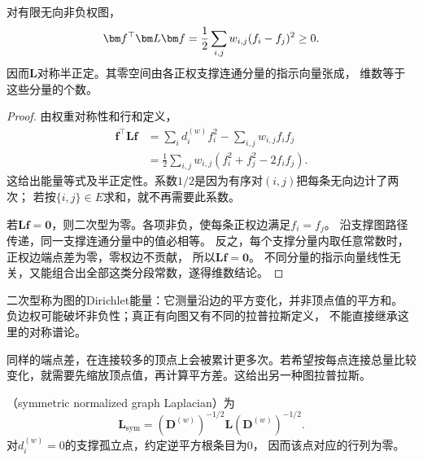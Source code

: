 \begin{theorem}[图拉普拉斯的Dirichlet能量与零空间]
  \label{thm:graph-theory-laplacian-energy-nullspace}
  对有限无向非负权图，
  \begingroup
  \let\graphenergylabel\label
  \begin{equation}
    \let\label\graphenergylabel
    \bm f^\top\bm L\bm f
    =\frac12\sum_{i,j}w_{i,j}(f_i-f_j)^2\geq0.
    \label{eq:graph-theory-dirichlet-energy}
    \label{eq:signal-analysis-graph-dirichlet-energy}
  \end{equation}
  \endgroup
  因而\(\bm L\)对称半正定。其零空间由各正权支撑连通分量的指示向量张成，
  维数等于这些分量的个数。
\end{theorem}

\begin{proof}
由权重对称性和行和定义，
\begin{align*}
  \bm f^\top\bm L\bm f
  &=\sum_i d_i^{(w)}f_i^2-\sum_{i,j}w_{i,j}f_if_j\\
  &=\frac12\sum_{i,j}w_{i,j}(f_i^2+f_j^2-2f_if_j).
\end{align*}
这给出能量等式及半正定性。系数\(1/2\)是因为有序对\((i,j)\)把每条无向边计了两次；
若按\(\{i,j\}\in E\)求和，就不再需要此系数。

若\(\bm L\bm f=\bm0\)，则二次型为零。各项非负，使每条正权边满足\(f_i=f_j\)。
沿支撑图路径传递，同一支撑连通分量中的值必相等。
反之，每个支撑分量内取任意常数时，正权边端点差为零，零权边不贡献，
所以\(\bm L\bm f=\bm0\)。
不同分量的指示向量线性无关，又能组合出全部这类分段常数，遂得维数结论。
\end{proof}

二次型称为图的Dirichlet能量：它测量沿边的平方变化，并非顶点值的平方和。
负边权可能破坏非负性；真正有向图又有不同的拉普拉斯定义，
不能直接继承这里的对称谱论。

同样的端点差，在连接较多的顶点上会被累计更多次。若希望按每点连接总量比较
变化，就需要先缩放顶点值，再计算平方差。这给出另一种图拉普拉斯。
\begin{definition}[对称归一化拉普拉斯]
  \label{def:graph-theory-normalized-laplacian}
  （symmetric normalized graph Laplacian）为
  \begin{equation}
    \bm L_{\mathrm{sym}}
    =(\bm D^{(w)})^{-1/2}\bm L(\bm D^{(w)})^{-1/2}.
    \label{eq:graph-theory-normalized-laplacian}
  \end{equation}
  对\(d_i^{(w)}=0\)的支撑孤立点，约定逆平方根条目为\(0\)，
  因而该点对应的行列为零。
\end{definition}

